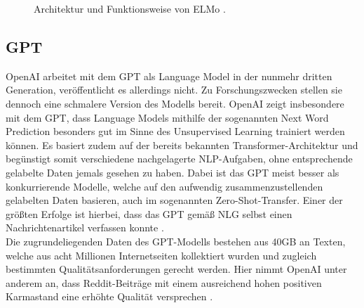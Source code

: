 \begin{figure}[h!]
  \centering
  \caption{Architektur und Funktionsweise von ELMo \cite{IRE18}.}
  \label{pic:ElmoStructure}
\end{figure}


\subsection{GPT}
\noindent
OpenAI arbeitet mit dem \ac{GPT} als Language Model in der nunmehr dritten Generation, veröffentlicht es allerdings nicht. Zu Forschungszwecken stellen sie dennoch eine schmalere Version des Modells bereit. OpenAI zeigt insbesondere mit dem \ac{GPT}, dass Language Models mithilfe der sogenannten Next Word Prediction besonders gut im Sinne des Unsupervised Learning trainiert werden können. Es basiert zudem auf der bereits bekannten Transformer-Architektur und begünstigt somit verschiedene nachgelagerte \ac{NLP}-Aufgaben, ohne entsprechende gelabelte Daten jemals gesehen zu haben. Dabei ist das \ac{GPT} meist besser als konkurrierende Modelle, welche auf den aufwendig zusammenzustellenden gelabelten Daten basieren, auch im sogenannten Zero-Shot-Transfer. Einer der größten Erfolge ist hierbei, dass das \ac{GPT} gemäß \ac{NLG} selbst einen Nachrichtenartikel verfassen konnte \cite[S.~1]{RAD19}.\\

\noindent
Die zugrundeliegenden Daten des \ac{GPT}-Modells bestehen aus 40GB an Texten, welche aus acht Millionen Internetseiten kollektiert wurden und zugleich bestimmten Qualitätsanforderungen gerecht werden. Hier nimmt OpenAI unter anderem an, dass Reddit-Beiträge mit einem ausreichend hohen positiven Karmastand eine erhöhte Qualität versprechen \cite[S.~3]{RAD19}.\\

